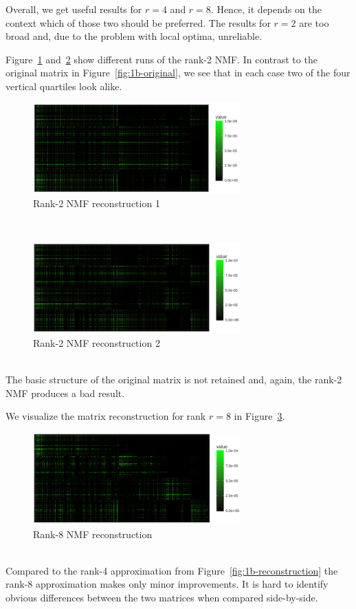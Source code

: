 \documentclass{support/acm_proc_article-sp}
\begin{document}
    Overall, we get useful results for $r = 4$ and $r = 8$.
    Hence, it depends on the context which of those two should be preferred.
    The results for $r = 2$ are too broad and, due to the problem with local optima, unreliable.

    Figure~\ref{fig:1d-rank2-1} and~\ref{fig:1d-rank2-2} show different runs of the rank-2 NMF\@.
    In contrast to the original matrix in Figure~\ref{fig:1b-original}, we see that in each case two of the four
    vertical quartiles look alike.
    \begin{figure}[htbp]
        \centering
        \includegraphics[width=8cm]{images/1d-rank2-1.png}
        \caption{Rank-2 NMF reconstruction 1}
        \label{fig:1d-rank2-1}
    \end{figure} \\
    \begin{figure}[htbp]
        \centering
        \includegraphics[width=8cm]{images/1d-rank2-2.png}
        \caption{Rank-2 NMF reconstruction 2}
        \label{fig:1d-rank2-2}
    \end{figure} \\
    The basic structure of the original matrix is not retained and, again, the rank-2 NMF produces a bad result.

    We visualize the matrix reconstruction for rank $r = 8$ in Figure~\ref{fig:1d-rank8}.
    \begin{figure}[htbp]
        \centering
        \includegraphics[width=8cm]{images/1d-rank8.png}
        \caption{Rank-8 NMF reconstruction}
        \label{fig:1d-rank8}
    \end{figure} \\
    Compared to the rank-4 approximation from Figure~\ref{fig:1b-reconstruction} the rank-8 approximation
    makes only minor improvements.
    It is hard to identify obvious differences between the two matrices when compared side-by-side.
\end{document}
